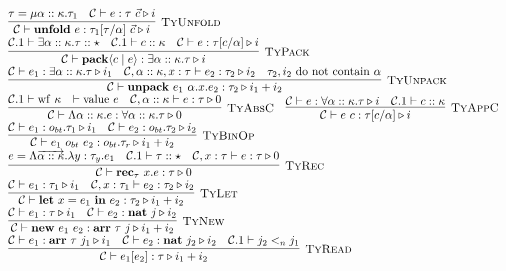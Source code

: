 \documentclass[fleqn]{article}
\begin{document}
\[\begin{array}{l}
    \infer[\textsc{TyUnfold}]{\mathcal{C} \vdash \mathbf{unfold}~e : \tau_1[\tau/\alpha]~\vec{c} \triangleright i}{\tau = \mu \alpha :: \kappa. \tau_1 & \mathcal{C} \vdash e : \tau~\vec{c} \triangleright i} \\
    \infer[\textsc{TyPack}]{\mathcal{C} \vdash \mathbf{pack}\langle c \mid e \rangle : \exists \alpha :: \kappa. \tau \triangleright i}{\mathcal{C}.1 \vdash \exists \alpha :: \kappa. \tau :: \star & \mathcal{C}.1 \vdash c :: \kappa & \mathcal{C} \vdash e : \tau[c/\alpha] \triangleright i} \\
    \infer[\textsc{TyUnpack}]{\mathcal{C} \vdash \mathbf{unpack}~e_1~\alpha.x.e_2 : \tau_2 \triangleright i_1 + i_2}{\mathcal{C} \vdash e_1 : \exists \alpha :: \kappa. \tau \triangleright i_1 & \mathcal{C},\alpha::\kappa,x:\tau \vdash e_2 : \tau_2 \triangleright i_2 & \tau_2,i_2~\mathrm{do~not~contain}~\alpha} \\
    \infer[\textsc{TyAbsC}]{\mathcal{C} \vdash \Lambda \alpha :: \kappa. e : \forall \alpha :: \kappa. \tau \triangleright 0}{\mathcal{C}.1 \vdash \mathrm{wf}~\kappa & \vdash \mathrm{value}~e & \mathcal{C},\alpha :: \kappa \vdash e : \tau \triangleright 0} \hspace{1em}
    \infer[\textsc{TyAppC}]{\mathcal{C} \vdash e~c : \tau[c/\alpha] \triangleright i}{\mathcal{C} \vdash e : \forall \alpha :: \kappa. \tau \triangleright i & \mathcal{C}.1 \vdash c :: \kappa} \\
    \infer[\textsc{TyBinOp}]{\mathcal{C} \vdash e_1~o_{bt}~e_2 : o_{bt}.\tau_r \triangleright i_1 + i_2}{\mathcal{C} \vdash e_1 : o_{bt}.\tau_1 \triangleright i_1 & \mathcal{C} \vdash e_2 : o_{bt}.\tau_2 \triangleright i_2} \\
    \infer[\textsc{TyRec}]{\mathcal{C} \vdash \mathbf{rec}_\tau~x. e : \tau \triangleright 0}{e = \Lambda \overrightarrow{\alpha :: \kappa}. \lambda y : \tau_y. e_1 & \mathcal{C}.1 \vdash \tau :: \star & \mathcal{C},x:\tau \vdash e : \tau \triangleright 0} \\
    \infer[\textsc{TyLet}]{\mathcal{C} \vdash \mathbf{let}~x=e_1~\mathbf{in}~e_2 : \tau_2 \triangleright i_1 + i_2}{\mathcal{C} \vdash e_1 : \tau_1 \triangleright i_1 & \mathcal{C},x:\tau_1 \vdash e_2 : \tau_2 \triangleright i_2} \\
    \infer[\textsc{TyNew}]{\mathcal{C} \vdash \mathbf{new}~e_1~e_2 : \mathbf{arr}~\tau~j \triangleright i_1 + i_2}{\mathcal{C} \vdash e_1 : \tau \triangleright i_1 & \mathcal{C} \vdash e_2 : \mathbf{nat}~j \triangleright i_2} \\
    \infer[\textsc{TyRead}]{\mathcal{C} \vdash e_1[e_2] : \tau \triangleright i_1 + i_2}{\mathcal{C} \vdash e_1 : \mathbf{arr}~\tau~j_1 \triangleright i_1 & \mathcal{C} \vdash e_2 : \mathbf{nat}~j_2 \triangleright i_2 & \mathcal{C}.1 \vdash j_2 <_n j_1} \\

\end{array}\]
\end{document}
